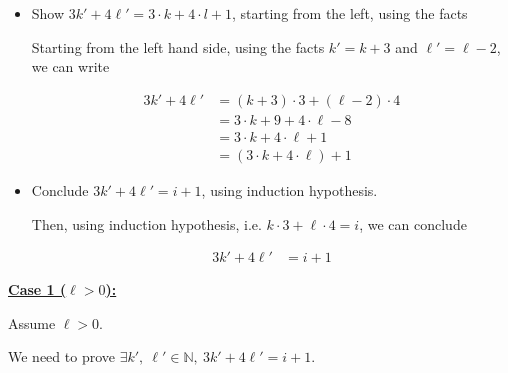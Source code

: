 \documentclass[12pt]{article}
\begin{document}
\begin{itemize}
\begin{mdframed}
\begin{enumerate}[1.]
\begin{enumerate}[1.]
                \begin{itemize}
                    \item Show $3k' + 4\ell' = 3 \cdot k + 4 \cdot l + 1$, starting from the left, using the facts

                    \begin{mdframed}
                    Starting from the left hand side, using the facts $k' = k + 3$ and $\ell' = \ell - 2$, we can write

                    \setcounter{equation}{0}
                    \begin{align}
                        3k' + 4\ell' &= (k+3) \cdot 3 + (\ell-2) \cdot 4\\
                        &= 3 \cdot k + 9 + 4 \cdot \ell - 8\\
                        &= 3 \cdot k + 4 \cdot \ell + 1\\
                        &= (3 \cdot k + 4 \cdot \ell) + 1
                    \end{align}

                    \end{mdframed}

                    \item Conclude $3k' + 4\ell' = i + 1$, using induction hypothesis.

                    \begin{mdframed}
                        Then, using induction hypothesis, i.e. $k \cdot 3 + \ell \cdot 4 = i$, we can conclude

                        \begin{align}
                            3k' + 4\ell' &= i + 1
                        \end{align}
                    \end{mdframed}
                \end{itemize}

                \bigskip

                \begin{mdframed}
                \underline{\textbf{Case 1 ($\ell > 0$):}}

                \bigskip

                Assume $\ell > 0$.

                \bigskip

                We need to prove $\exists k',\:\ell' \in \mathbb{N},\:3k' + 4\ell' = i + 1$.

                \bigskip


\end{mdframed}
\end{enumerate}
\end{enumerate}
\end{mdframed}
\end{itemize}
\end{document}
